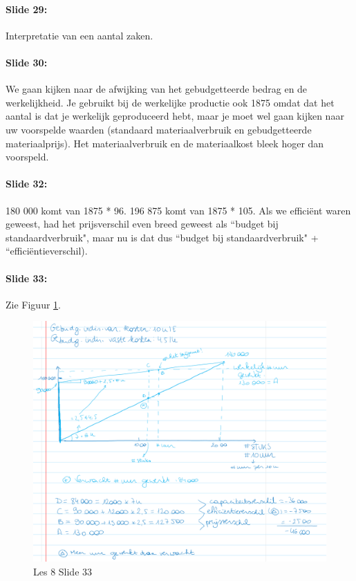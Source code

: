 \documentclass[10pt,a4paper]{report}
\begin{document}
\paragraph{Slide 29:} Interpretatie van een aantal zaken.

\paragraph{Slide 30:} We gaan kijken naar de afwijking van het gebudgetteerde bedrag en de werkelijkheid. Je gebruikt bij de werkelijke productie ook 1875 omdat dat het aantal is dat je werkelijk geproduceerd hebt, maar je moet wel gaan kijken naar uw voorspelde waarden (standaard materiaalverbruik en gebudgetteerde materiaalprijs). Het materiaalverbruik en de materiaalkost bleek hoger dan voorspeld. 

\paragraph{Slide 32:} 180 000 komt van 1875 * 96. 196 875 komt van 1875 * 105. Als we effici\"ent waren geweest, had het prijsverschil even breed geweest als ``budget bij standaardverbruik", maar nu is dat dus ``budget bij standaardverbruik" + ``effici\"entieverschil).

\paragraph{Slide 33:} Zie Figuur \ref{les08_03}.

\begin{figure}[h!]
\centering
\includegraphics[width=120mm]{Les08_03.png}
\caption{Les 8 Slide 33} 
\label{les08_03}
\end{figure}
\end{document}
